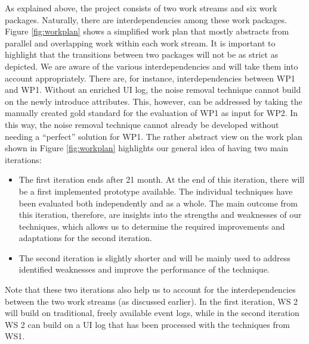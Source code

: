 As explained above, the project consists of two work streams and six work packages. Naturally, there are interdependencies among these work packages. Figure \ref{fig:workplan} shows a simplified work plan that mostly abstracts from parallel and overlapping work within each work stream. It is important to highlight that the transitions between two packages will not be as strict as depicted. We are aware of the various interdependencies and will take them into account appropriately.  
There are, for instance, interdependencies between WP1 and WP1. Without an enriched UI log, the noise removal technique cannot build on the newly introduce attributes. This, however, can be addressed by taking the manually created gold standard for the evaluation of WP1 as input for WP2. In this way, the noise removal technique cannot already be developed without needing a ``perfect'' solution for WP1. The rather abstract view on the work plan shown in Figure \ref{fig:workplan} highlights our general idea of having two main iterations:
\begin{itemize}
\item The first iteration ends after 21 month. At the end of this iteration, there will be a first implemented prototype available. The individual techniques have been evaluated both independently and as a whole. The main outcome from this iteration, therefore, are insights into the strengths and weaknesses of our techniques, which allows us to determine the required improvements and adaptations for the second iteration. 
\item The second iteration is slightly shorter and will be mainly used to address identified weaknesses and improve the performance of the technique.
\end{itemize} 

Note that these two iterations also help us to account for the interdependencies between the two work streams (as discussed earlier). In the first iteration, WS 2 will build on traditional, freely available event logs, while in the second iteration WS 2 can build on a UI log that has been processed with the techniques from WS1. 



